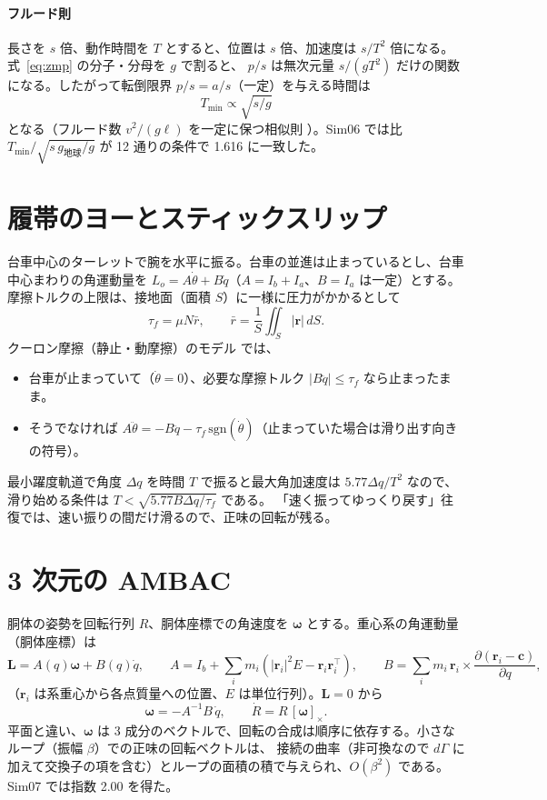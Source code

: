 \paragraph{フルード則}
長さを $s$ 倍、動作時間を $T$ とすると、位置は $s$ 倍、加速度は $s/T^2$ 倍になる。式~\eqref{eq:zmp} の分子・分母を $g$ で割ると、
$p/s$ は無次元量 $s/(gT^2)$ だけの関数になる。したがって転倒限界 $p/s=a/s$（一定）を与える時間は
\begin{equation}
T_{\min}\propto\sqrt{s/g}
\end{equation}
となる（フルード数 $v^2/(g\ell)$ を一定に保つ相似則 \cite{R29}）。Sim06 では比 $T_{\min}/\sqrt{s\,g_{\text{地球}}/g}$ が 12 通りの条件で 1.616 に一致した。

\section{履帯のヨーとスティックスリップ}\label{app:stickslip}

台車中心のターレットで腕を水平に振る。台車の並進は止まっているとし、台車中心まわりの角運動量を $L_o = A\dot\theta + B\dot q$（$A=I_b+I_a$、$B=I_a$ は一定）とする。
摩擦トルクの上限は、接地面（面積 $S$）に一様に圧力がかかるとして
\begin{equation}
\tau_f = \mu N\bar r,\qquad \bar r = \frac{1}{S}\iint_S|\bm r|\,dS .
\end{equation}
クーロン摩擦（静止・動摩擦）のモデル \cite{R30} では、
\begin{itemize}
\item 台車が止まっていて（$\dot\theta=0$）、必要な摩擦トルク $|B\ddot q|\le\tau_f$ なら止まったまま。
\item そうでなければ $A\ddot\theta = -B\ddot q - \tau_f\,\mathrm{sgn}(\dot\theta)$（止まっていた場合は滑り出す向きの符号）。
\end{itemize}
最小躍度軌道で角度 $\Delta q$ を時間 $T$ で振ると最大角加速度は $5.77\Delta q/T^2$ なので、滑り始める条件は $T<\sqrt{5.77B\Delta q/\tau_f}$ である。
「速く振ってゆっくり戻す」往復では、速い振りの間だけ滑るので、正味の回転が残る。

\section{3 次元の AMBAC}\label{app:3d}

胴体の姿勢を回転行列 $R$、胴体座標での角速度を $\bm\omega$ とする。重心系の角運動量（胴体座標）は
\begin{equation}
\bm L = A(q)\bm\omega + B(q)\dot q,\qquad
A = I_b + \sum_i m_i\left(|\bm r_i|^2E - \bm r_i\bm r_i^\top\right),\qquad
B = \sum_i m_i\,\bm r_i\times\frac{\partial(\bm r_i-\bm c)}{\partial q},
\end{equation}
（$\bm r_i$ は系重心から各点質量への位置、$E$ は単位行列）。$\bm L=0$ から
\begin{equation}
\bm\omega = -A^{-1}B\,\dot q,\qquad \dot R = R\,[\bm\omega]_\times .
\end{equation}
平面と違い、$\bm\omega$ は 3 成分のベクトルで、回転の合成は順序に依存する。小さなループ（振幅 $\beta$）での正味の回転ベクトルは、
接続の曲率（非可換なので $d\Gamma$ に加えて交換子の項を含む）とループの面積の積で与えられ、$O(\beta^2)$ である。Sim07 では指数 2.00 を得た。

